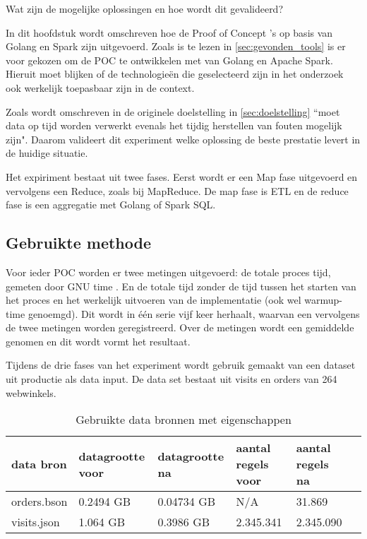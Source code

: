 Wat zijn de mogelijke oplossingen en hoe wordt dit gevalideerd?

In dit hoofdstuk wordt omschreven hoe de Proof of Concept 's op basis van Golang en Spark zijn uitgevoerd. Zoals is te lezen in \ref{sec:gevonden_tools} is er voor gekozen om de POC te ontwikkelen met van Golang en Apache Spark. Hieruit moet blijken of de technologieën die geselecteerd zijn in het onderzoek ook werkelijk toepasbaar zijn in de context.

Zoals wordt omschreven in de originele doelstelling in \ref{sec:doelstelling}
``moet data op tijd worden verwerkt evenals het tijdig herstellen van fouten mogelijk zijn". Daarom valideert dit experiment welke oplossing de beste prestatie levert in de huidige situatie.

Het expiriment bestaat uit twee fases. Eerst wordt er een Map fase uitgevoerd en vervolgens een Reduce, zoals bij MapReduce. De map fase is 
ETL en de reduce fase is een aggregatie met Golang of Spark SQL.

\subsection{Gebruikte methode}

Voor ieder POC worden er twee metingen uitgevoerd: de totale proces tijd, gemeten door GNU time \parencite{gnu_time}. En de totale tijd zonder de tijd tussen het starten van het proces en het werkelijk uitvoeren van de implementatie (ook wel warmup-time genoemgd). Dit wordt in één serie vijf keer herhaalt, waarvan een vervolgens de twee metingen worden geregistreerd. Over de metingen wordt een gemiddelde genomen en dit wordt vormt het resultaat.

Tijdens de drie fases van het experiment wordt gebruik gemaakt van een dataset uit productie als data input. De data set bestaat uit visits en orders van 264 webwinkels.

\begin{table}[h]
\centering
\caption{Gebruikte data bronnen met eigenschappen}
\label{tab:datasets}
\begin{tabular}{|l|l|l|l|l|l|}
\hline
data bron & datagrootte voor & datagrootte na & aantal regels voor & aantal regels na \\ \hline
orders.bson    &  0.2494 GB & 0.04734 GB       & N/A                & 31.869           \\ \hline
visits.json & 1.064 GB               & 0.3986 GB      & 2.345.341          & 2.345.090        \\ \hline
\end{tabular}
\end{table}


